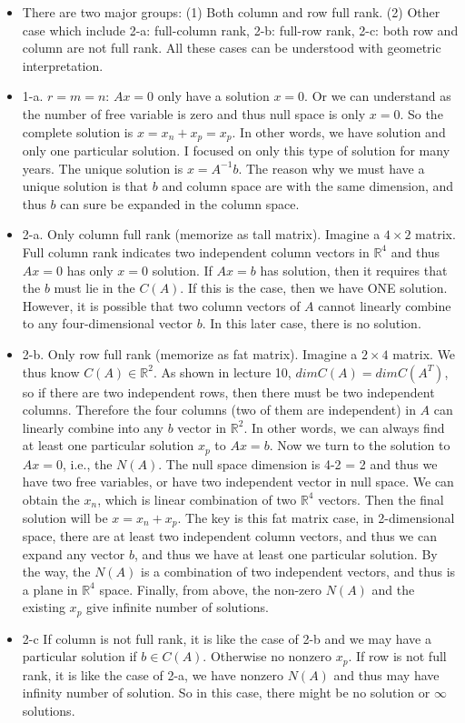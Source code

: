 \documentclass[11pt]{article}
\providecommand{\tightlist}{%
      \setlength{\itemsep}{0pt}\setlength{\parskip}{0pt}}
\begin{document}
\begin{itemize}
\tightlist
\item
  There are two major groups: (1) Both column and row full rank. (2)
  Other case which include 2-a: full-column rank, 2-b: full-row rank,
  2-c: both row and column are not full rank. All these cases can be
  understood with geometric interpretation.
\item
  1-a. \(r=m=n\): \(Ax = 0\) only have a solution \(x=0\). Or we can
  understand as the number of free variable is zero and thus null space
  is only \(x=0\). So the complete solution is
  \(x=x_{n}+x_{p} = x_{p}\). In other words, we have solution and only
  one particular solution. I focused on only this type of solution for
  many years. The unique solution is \(x=A^{-1}b\). The reason why we
  must have a unique solution is that \(b\) and column space are with
  the same dimension, and thus \(b\) can sure be expanded in the column
  space.
\item
  2-a. Only column full rank (memorize as tall matrix). Imagine a
  \(4\times2\) matrix. Full column rank indicates two independent column
  vectors in \(\mathbb{R}^4\) and thus \(Ax=0\) has only \(x=0\)
  solution. If \(Ax=b\) has solution, then it requires that the \(b\)
  must lie in the \(C(A)\). If this is the case, then we have ONE
  solution. However, it is possible that two column vectors of \(A\)
  cannot linearly combine to any four-dimensional vector \(b\). In this
  later case, there is no solution.
\item
  2-b. Only row full rank (memorize as fat matrix). Imagine a
  \(2\times4\) matrix. We thus know \(C(A)\in \mathbb{R}^2\). As shown
  in lecture 10, \(dim C(A) = dim C(A^T)\), so if there are two
  independent rows, then there must be two independent columns.
  Therefore the four columns (two of them are independent) in \(A\) can
  linearly combine into any \(b\) vector in \(\mathbb{R}^2\). In other
  words, we can always find at least one particular solution \(x_p\) to
  \(Ax = b\). Now we turn to the solution to \(Ax = 0\), i.e., the
  \(N(A)\). The null space dimension is 4-2 = 2 and thus we have two
  free variables, or have two independent vector in null space. We can
  obtain the \(x_n\), which is linear combination of two
  \(\mathbb{R}^4\) vectors. Then the final solution will be
  \(x = x_n+x_p\). The key is this fat matrix case, in 2-dimensional
  space, there are at least two independent column vectors, and thus we
  can expand any vector \(b\), and thus we have at least one particular
  solution. By the way, the \(N(A)\) is a combination of two independent
  vectors, and thus is a plane in \(\mathbb{R}^4\) space. Finally, from
  above, the non-zero \(N(A)\) and the existing \(x_p\) give infinite
  number of solutions.
\item
  2-c If column is not full rank, it is like the case of 2-b and we may
  have a particular solution if \(b \in C(A)\). Otherwise no nonzero
  \(x_p\). If row is not full rank, it is like the case of 2-a, we have
  nonzero \(N(A)\) and thus may have infinity number of solution. So in
  this case, there might be no solution or \(\infty\) solutions.
\end{itemize}
\end{document}
